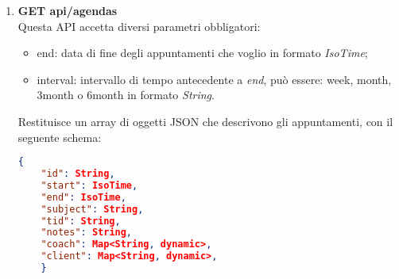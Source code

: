 \begin{enumerate}
\begin{itemize}
\begin{itemize}
            \item duration\textunderscore normal: sono i minuti attivi normali da raggiungere, \textit{m} è il tipo di metrica e \textit{thresh} è la soglia;
            \item steps: sono i passi da fare, \textit{m} è il tipo di metrica e \textit{thresh} è la soglia;
        \end{itemize}
        \item status:
        \begin{itemize}
            \item calories: sono le calorie bruciate;
            \item duration\textunderscore activities: sono i minuti di attività raggiunti;
            \item duration\textunderscore normal: sono i minuti attivi normali raggiunti;
            \item steps: sono i passi fatti;
        \end{itemize}
        \item start: è la data di inizio dell'obiettivo;
        \item end: è la data di fine dell'obiettivo;
        \item achieved: indica se l'obiettivo è stato raggiunto;
        \item active: indica se l'obiettivo è attivo.
    \end{itemize}
    \item \textbf{GET api/agendas}\\
    Questa API accetta diversi parametri obbligatori:
    \begin{itemize}
        \item end: data di fine degli appuntamenti che voglio in formato \textit{IsoTime};
        \item interval: intervallo di tempo antecedente a \textit{end}, può essere: week, month, 3month o 6month in formato \textit{String}.
    \end{itemize}
    Restituisce un array di oggetti JSON che descrivono gli appuntamenti, con il seguente schema:
    \begin{lstlisting}[language=json,firstnumber=1,caption={JSON schema dell'API GET api/agendas},captionpos=b]
    {
    "id": String,
    "start": IsoTime,
    "end": IsoTime,
    "subject": String,
    "tid": String,
    "notes": String,
    "coach": Map<String, dynamic>,
    "client": Map<String, dynamic>,
    }
    \end{lstlisting}

\end{enumerate}
